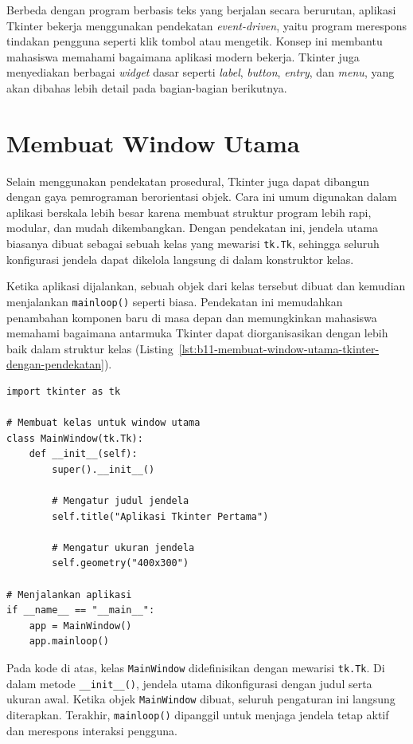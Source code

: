Berbeda dengan program berbasis teks yang berjalan secara berurutan, aplikasi Tkinter bekerja menggunakan pendekatan \textit{event-driven}, yaitu program merespons tindakan pengguna seperti klik tombol atau mengetik. Konsep ini membantu mahasiswa memahami bagaimana aplikasi modern bekerja. Tkinter juga menyediakan berbagai \textit{widget} dasar seperti \textit{label}, \textit{button}, \textit{entry}, dan \textit{menu}, yang akan dibahas lebih detail pada bagian-bagian berikutnya.

\section{Membuat Window Utama}

Selain menggunakan pendekatan prosedural, Tkinter juga dapat dibangun dengan gaya pemrograman berorientasi objek. Cara ini umum digunakan dalam aplikasi berskala lebih besar karena membuat struktur program lebih rapi, modular, dan mudah dikembangkan. Dengan pendekatan ini, jendela utama biasanya dibuat sebagai sebuah kelas yang mewarisi \texttt{tk.Tk}, sehingga seluruh konfigurasi jendela dapat dikelola langsung di dalam konstruktor kelas.

Ketika aplikasi dijalankan, sebuah objek dari kelas tersebut dibuat dan kemudian menjalankan \texttt{mainloop()} seperti biasa. Pendekatan ini memudahkan penambahan komponen baru di masa depan dan memungkinkan mahasiswa memahami bagaimana antarmuka Tkinter dapat diorganisasikan dengan lebih baik dalam struktur kelas (Listing~\ref{lst:b11-membuat-window-utama-tkinter-dengan-pendekatan}).

\begin{lstlisting}[style=PythonStyle, caption={Membuat Window Utama Tkinter dengan Pendekatan Class}, label={lst:b11-membuat-window-utama-tkinter-dengan-pendekatan}]
import tkinter as tk

# Membuat kelas untuk window utama
class MainWindow(tk.Tk):
    def __init__(self):
        super().__init__()

        # Mengatur judul jendela
        self.title("Aplikasi Tkinter Pertama")

        # Mengatur ukuran jendela
        self.geometry("400x300")

# Menjalankan aplikasi
if __name__ == "__main__":
    app = MainWindow()
    app.mainloop()
\end{lstlisting}

Pada kode di atas, kelas \texttt{MainWindow} didefinisikan dengan mewarisi \texttt{tk.Tk}. Di dalam metode \texttt{\_\_init\_\_()}, jendela utama dikonfigurasi dengan judul serta ukuran awal. Ketika objek \texttt{MainWindow} dibuat, seluruh pengaturan ini langsung diterapkan. Terakhir, \texttt{mainloop()} dipanggil untuk menjaga jendela tetap aktif dan merespons interaksi pengguna.



